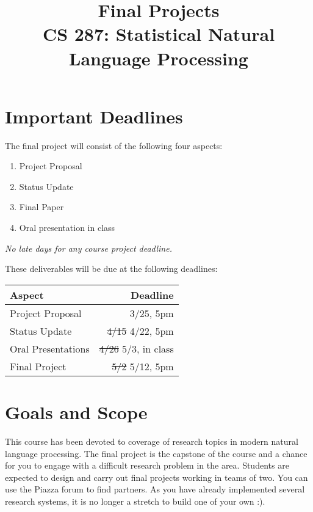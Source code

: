 \documentclass[11pt]{article}
\title{Final Projects  \\ CS 287: Statistical Natural Language Processing}
\date{}
\begin{document}
\maketitle{}

\section{Important Deadlines}

The final project will consist of the following four aspects:

\begin{enumerate}
\item Project Proposal
\item Status Update
\item Final Paper
\item Oral presentation in class
\end{enumerate}
\emph{No late days for any course project deadline.}

\vspace{0.25cm}

\noindent These deliverables will be due at the following deadlines:

\begin{center}
\begin{tabularx}{0.4\linewidth}{lr}
  \toprule
  Aspect & Deadline \\
  \midrule
  Project Proposal & 3/25, 5pm \\
  Status Update & \sout{4/15} 4/22, 5pm \\
  Oral Presentations&  \sout{4/26} 5/3, in class \\
  Final Project &  \sout{5/2} 5/12, 5pm \\
  \bottomrule
\end{tabularx}
\end{center}


\section{Goals and Scope}\label{goals-and-scope}

This course has been devoted to coverage of research
topics in modern natural language processing. The final 
project is the capstone of the course and a chance for you 
to engage with a difficult research problem in the area. 
Students are expected to design and carry out final
projects working in teams of two. You can use the Piazza forum
to find partners. 
As you have already implemented several research systems, 
it is no longer a stretch to build one of your own :).
\end{document}
